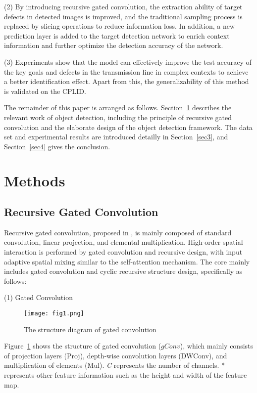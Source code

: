 \documentclass[sn-mathphys,Numbered]{sn-jnl}%
\theoremstyle{thmstyleone}%
\theoremstyle{thmstyletwo}%
\theoremstyle{thmstylethree}%
\begin{document}
(2) By introducing recursive gated convolution, the extraction ability of target defects in detected images is improved, and the traditional sampling process is replaced by slicing operations to reduce information loss. In addition, a new prediction layer is added to the target detection network to enrich context information and further optimize the detection accuracy of the network. 

(3) Experiments show that the model can effectively improve the test accuracy of the key goals and defects in the transmission line in complex contexts to achieve a better identification effect. Apart from this, the generalizability of this method is validated on the CPLID.



The remainder of this paper is arranged as follows. Section~\ref{sec2} describes the relevant work of object detection, including the principle of recursive gated convolution and the elaborate design of the object detection framework. The data set and experimental results are introduced detailly in Section~\ref{sec3}, and Section~\ref{sec4} gives the conclusion.

\section{Methods}
\label{sec2}  %

\subsection{Recursive Gated Convolution}

Recursive gated convolution, proposed in \cite{rao2022hornet}, is mainly composed of standard convolution, linear projection, and elemental multiplication. High-order spatial interaction is performed by gated convolution and recursive design, with input adaptive spatial mixing similar to the self-attention mechanism. The core mainly includes gated convolution and cyclic recursive structure design, specifically as follows:

(1) Gated Convolution
\begin{figure}[h]%
\centering
\texttt{[image: fig1.png]}
\caption{The structure diagram of gated convolution}\label{fig1}
\end{figure}

Figure~\ref{fig1} shows the structure of gated convolution ($gConv$), which mainly consists of projection layers (Proj), depth-wise convolution layers (DWConv), and multiplication of elements (Mul). \emph{C} represents the number of channels. * represents other feature information such as the height and width of the feature map.
\end{document}
